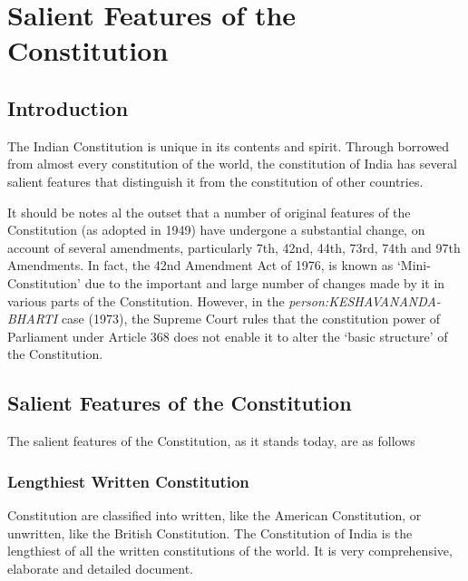\printendnotes\cleardoublepage
%

\twocolumn

\chapter{Salient Features of the Constitution}

\section{Introduction}

The Indian Constitution is unique in its contents and spirit. Through borrowed from almost every constitution of the world, the constitution of India has several salient features that distinguish it from the constitution of other countries.

It should be notes al the outset that a number of original features of the Constitution (as adopted in 1949) have undergone a substantial change, on account of several amendments, particularly 7th, 42nd, 44th, 73rd, 74th and 97th Amendments. In fact, the 42nd Amendment Act of 1976, is known as `Mini-Constitution' due to the important and large number of changes made by it in various parts of the Constitution. However, in the { \textit{\gls{person:KESHAVANANDA-BHARTI}}} case (1973), the Supreme Court rules that the constitution power of Parliament under Article 368 does not enable it to alter the `basic structure' of the Constitution.

\section{Salient Features of the Constitution}

The salient features of the Constitution, as it stands today, are as follows

\subsection{Lengthiest Written Constitution}

Constitution are classified into written, like the American Constitution, or unwritten, like the British Constitution. The Constitution of India is the lengthiest of all the written constitutions of the world. It is very comprehensive, elaborate and detailed document.

